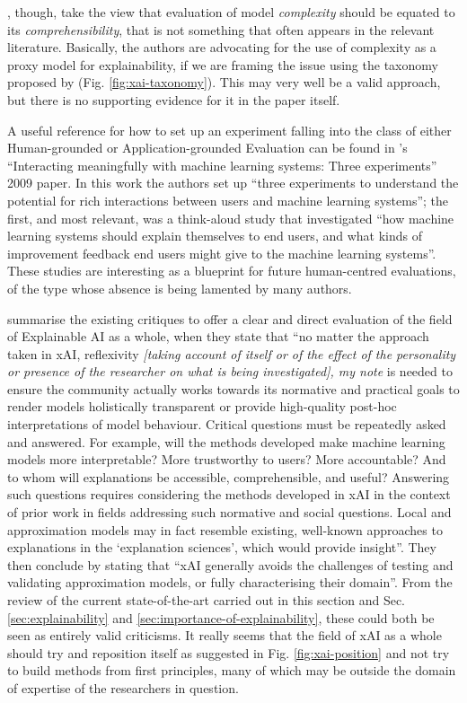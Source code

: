 \cite{guidotti2018survey}, though, take the view that evaluation of model \textit{complexity} should be equated to its \textit{comprehensibility}, that is not something that often appears in the relevant literature.
Basically, the authors are advocating for the use of complexity as a proxy model for explainability, if we are framing the issue using the taxonomy proposed by \cite{doshi2017towards} (Fig. \ref{fig:xai-taxonomy}).
This may very well be a valid approach, but there is no supporting evidence for it in the paper itself.

A useful reference for how to set up an experiment falling into the class of either Human-grounded or Application-grounded Evaluation can be found in \cite{stumpf2009interacting}'s \enquote{Interacting meaningfully with machine learning systems: Three experiments} 2009 paper.
In this work the authors set up \enquote{three experiments to understand the potential for rich interactions between users and machine learning systems}; the first, and most relevant, was a think-aloud study that investigated \enquote{how machine learning systems should explain themselves to end users, and what kinds of improvement feedback end users might give to the machine learning systems}.
These studies are interesting as a blueprint for future human-centred evaluations, of the type whose absence is being lamented by many authors.

\cite{mittelstadt2019explaining} summarise the existing critiques to offer a clear and direct evaluation of the field of Explainable AI as a whole, when they state that \enquote{no matter the approach taken in xAI, reflexivity \textit{[taking account of itself or of the effect of the personality or presence of the researcher on what is being investigated], my note} is needed to ensure the community actually works towards its normative and practical goals to render models holistically transparent or provide high-quality post-hoc interpretations of model behaviour. Critical questions must be repeatedly asked and answered. For example, will the methods developed make machine learning models more interpretable? More trustworthy to users? More accountable? And to whom will explanations be accessible, comprehensible, and useful? Answering such questions requires considering the methods developed in xAI in the context of prior work in fields addressing such normative and social questions. Local and approximation models may in fact resemble existing, well-known approaches to explanations in the `explanation sciences', which would provide insight}.
They then conclude by stating that \enquote{xAI generally avoids the challenges of testing and validating approximation models, or fully characterising their domain}.
From the review of the current state-of-the-art carried out in this section and Sec. \ref{sec:explainability} and \ref{sec:importance-of-explainability}, these could both be seen as entirely valid criticisms.
It really seems that the field of xAI as a whole should try and reposition itself as suggested in Fig. \ref{fig:xai-position} and not try to build methods from first principles, many of which may be outside the domain of expertise of the researchers in question.


